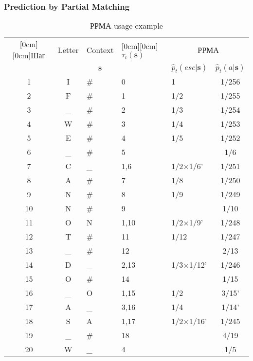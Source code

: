 \documentclass[14pt]{beamer}
\renewcommand{\vec}[1]{\ensuremath{\boldsymbol{#1}}}
\begin{document}
\begin{frame}
\frametitle{Prediction by Partial Matching}
\begin{itemize}    

    \begin{table}[htbp]
    \caption{РРМА usage example}
    \scriptsize{
    \begin{center}
    \scalebox{0.5} {
    \begin{tabular}
    {|c|c|l|l|l|c|} \hline %
    \raisebox{-1.50ex}[0cm][0cm]{Шаг}&
    {Letter}&
    {Context }&
    \raisebox{-1.50ex}[0cm][0cm]{$\tau _t ({\vec s})$}&
    \multicolumn{2}{c|}{РРМА}  \\
    \cline{5-6}
     & &\multicolumn{1}{c|}{$\vec s$}& &
    $\hat {p}_t(esc\vert {\vec s})$& $\hat {p}_t(a\vert {\vec s})$ \\ \hline%
    1& I& {{\#}}& 0& 1& 1/256 \\\hline %
    2& F& {\#}& 1& 1/2& 1/255 \\\hline %
    3& {\_}& {\#}& 2& 1/3& 1/254 \\ \hline %
    4& W& {\#}& 3& 1/4& 1/253 \\ \hline %
    5& E& {\#}& 4& 1/5& 1/252 \\ \hline %
    6& {\_}& {\#}& 5& & 1/6 \\ \hline %
    7& C& {\_}& 1,6& 1/2$\times $1/6'& 1/251 \\ \hline %
    8& A& {\#}& 7& 1/8& 1/250 \\ \hline %
    9& N& {\#}& 8& 1/9& 1/249 \\ \hline %
    10& N& {\#}& 9& & 1/10 \\ \hline %
    11& O& N & 1,10& 1/2$\times $1/9'& 1/248 \\ \hline %
    12& T& {\#}& 11& 1/12& 1/247 \\ \hline %
    13& {\_}& {\#}& 12& & 2/13 \\ \hline %
    14& D& {\_}& 2,13& 1/3$\times $1/12'& 1/246 \\ \hline %
    15& O& {\#}& 14& & 1/15 \\ \hline %
    16& {\_}& O & 1,15& 1/2& 3/15' \\ \hline %
    17& A& {\_}& 3,16& 1/4& 1/14' \\ \hline %
    18& S& A & 1,17& 1/2$\times $1/16'& 1/245 \\\hline %
    19& {\_}& {\#}& 18& & 4/19 \\ \hline %
    20& W& {\_}& 4& & 1/5 \\ \hline %

\end{tabular}}
\end{center}}
\end{table}
\end{itemize}
\end{frame}
\end{document}

